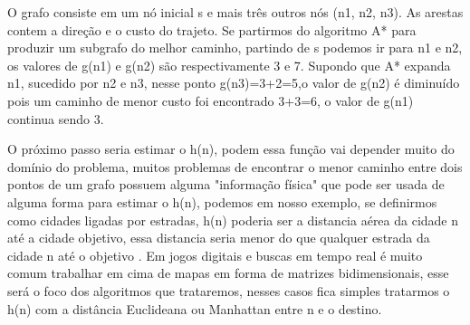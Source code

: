 \begin{minipage}{\linewidth}
\end{minipage}


    O grafo consiste em um nó inicial s e mais três outros nós (n1, n2, n3). As arestas contem a direção e o custo do trajeto. Se partirmos do algoritmo A* para produzir um subgrafo do melhor caminho, partindo de s podemos ir para n1 e n2, os valores de g(n1) e g(n2) são respectivamente 3 e 7. Supondo que A* expanda n1, sucedido por n2 e n3, nesse ponto g(n3)=3+2=5,o valor de g(n2) é diminuído pois um caminho de menor custo foi encontrado  3+3=6, o valor de g(n1) continua sendo 3.
    
    O próximo passo seria estimar o h(n), podem essa função vai depender muito do domínio do problema, muitos problemas de encontrar o menor caminho entre dois pontos de um grafo possuem alguma "informação física" que pode ser usada de alguma forma para estimar o h(n), podemos em nosso exemplo, se definirmos como cidades ligadas por estradas, h(n) poderia ser a distancia aérea da cidade n até a cidade objetivo, essa distancia seria menor do que qualquer estrada da cidade n até o objetivo \cite{PEHart}. Em jogos digitais e buscas em tempo real é muito comum trabalhar em cima de mapas em forma de matrizes bidimensionais, esse será o foco dos algoritmos que trataremos, nesses casos fica simples tratarmos o h(n) com a distância Euclideana ou Manhattan entre n e o destino. \cite{Yngvi}

